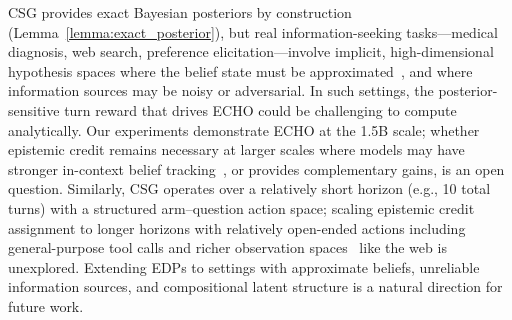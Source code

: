 \documentclass[11pt]{article}
\theoremstyle{plain}
\theoremstyle{definition}
\theoremstyle{remark}
\begin{document}
CSG provides exact Bayesian posteriors by construction
(Lemma~\ref{lemma:exact_posterior}), but real information-seeking
tasks---medical diagnosis, web search, preference
elicitation---involve implicit, high-dimensional hypothesis spaces
where the belief state must be
approximated~\citep{choudhury2025bed,choudhury2025processrewardmodelsllm,lee2025prints}, and where information
sources may be noisy or
adversarial. In such
settings, the posterior-sensitive turn reward that drives
\textsc{ECHO} could be challenging to compute analytically. %
Our experiments demonstrate \textsc{ECHO} at the 1.5B
scale; whether epistemic credit remains necessary at larger scales
where models may have stronger in-context belief
tracking~\citep{kossen2024incontext}, or provides complementary
gains, is an open question. Similarly, CSG operates over a
relatively short horizon (e.g., 10 total turns) with a structured arm--question action
space; scaling epistemic credit assignment to longer horizons with relatively
open-ended actions including general-purpose tool calls and richer observation
spaces~\citep{abdulhai2023lmrl,jinsearch} like the web is unexplored.
Extending EDPs to settings with approximate beliefs, unreliable
information sources, and compositional latent structure is a
natural direction for future work.
\end{document}
